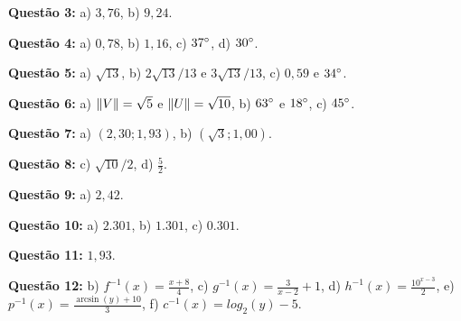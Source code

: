 \documentclass[main_estudante.tex]{subfiles}
\begin{document}
\noindent\textbf{Questão 3:} a) $3,76$, b) $9,24$.

\noindent\textbf{Questão 4:} a) $0,78$, b) $1,16$, c) $37\degree$, d) $30\degree$.

\noindent\textbf{Questão 5:} a) $\sqrt{13}$, b) $2\sqrt{13}/13$ e $3\sqrt{13}/13$, c) $0,59$ e $34\degree$.

\noindent\textbf{Questão 6:} a) $\Arrowvert V \Arrowvert = \sqrt{5}$ e $\Arrowvert U \Arrowvert = \sqrt{10}$, b) $63\degree$ e $18\degree$, c) $45\degree$.

\noindent\textbf{Questão 7:} a) $(2,30;1,93)$, b) $(\sqrt{3};1,00)$.

\noindent\textbf{Questão 8:} c) $\sqrt{10}/2$, d) $\frac{5}{2}$.

\noindent\textbf{Questão 9:} a) $2,42$.

\noindent\textbf{Questão 10:} a) $2.301$, b) $1.301$, c) $0.301$.

\noindent\textbf{Questão 11:} $1,93$.

\noindent\textbf{Questão 12:} b) $f^{-1}(x)=\frac{x+8}{4}$, c) $g^{-1}(x)=\frac{3}{x-2}+1$, d) $h^{-1}(x)=\frac{10^{x-3}}{2}$, e) $p^{-1}(x)=\frac{\arcsin(y)+10}{3}$, f) $c^{-1}(x)=log_2 (y)-5$.
\end{document}
